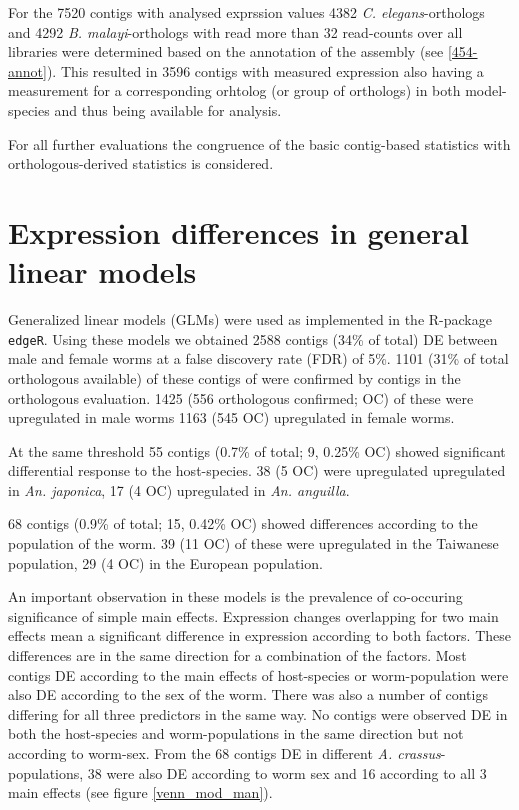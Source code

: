 For the 7520 contigs with analysed exprssion values 4382
\textit{C. elegans}-orthologs and 4292 \textit{B. malayi}-orthologs
with read more than 32 read-counts over all libraries were determined
based on the annotation of the assembly (see \ref{454-annot}). This
resulted in 3596 contigs with measured expression also having a
measurement for a corresponding orhtolog (or group of orthologs) in
both model-species and thus being available for analysis.

For all further evaluations the congruence of the basic contig-based
statistics with orthologous-derived statistics is considered.

\section{Expression differences in general linear models}

Generalized linear models (GLMs) were used as implemented in the
R-package \texttt{edgeR}. Using these models we obtained 2588 contigs
(34\% of total) DE between male and female worms at a false discovery
rate (FDR) of 5\%. 1101 (31\% of total orthologous available) of these
contigs of were confirmed by contigs in the orthologous
evaluation. 1425 (556 orthologous confirmed; OC) of these were
upregulated in male worms 1163 (545 OC) upregulated in female worms.

At the same threshold 55 contigs (0.7\% of total; 9, 0.25\% OC) showed
significant differential response to the host-species. 38 (5 OC) were
upregulated upregulated in \textit{An. japonica}, 17 (4 OC)
upregulated in \textit{An. anguilla}.

68 contigs (0.9\% of total; 15, 0.42\% OC) showed differences
according to the population of the worm. 39 (11 OC) of these were
upregulated in the Taiwanese population, 29 (4 OC) in the European
population.

An important observation in these models is the prevalence of
co-occuring significance of simple main effects. Expression changes
overlapping for two main effects mean a significant difference in
expression according to both factors. These differences are in the
same direction for a combination of the factors. Most contigs DE
according to the main effects of host-species or worm-population were
also DE according to the sex of the worm. There was also a number of
contigs differing for all three predictors in the same way. No contigs
were observed DE in both the host-species and worm-populations in the
same direction but not according to worm-sex. From the 68 contigs DE
in different \textit{A. crassus}-populations, 38 were also DE
according to worm sex and 16 according to all 3 main effects (see
figure \ref{venn_mod_man}).

